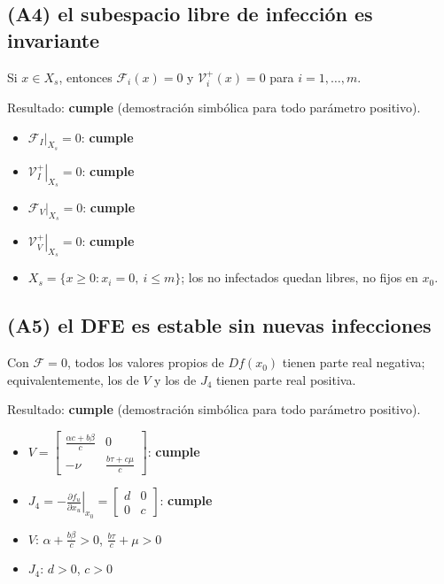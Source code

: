 \documentclass{article}
\begin{document}
\subsection*{(A4) el subespacio libre de infección es invariante}

Si $x \in X_s$, entonces $\mathcal{F}_i(x) = 0$ y $\mathcal{V}_i^+(x) = 0$ para $i = 1,\dots,m$.

Resultado: \textbf{cumple} (demostración simbólica para todo parámetro positivo).

\begin{itemize}
  \item $\left.\mathcal{F}_{I}\right\rvert_{X_s} = 0$: \textbf{cumple}
  \item $\left.\mathcal{V}_{I}^+\right\rvert_{X_s} = 0$: \textbf{cumple}
  \item $\left.\mathcal{F}_{V}\right\rvert_{X_s} = 0$: \textbf{cumple}
  \item $\left.\mathcal{V}_{V}^+\right\rvert_{X_s} = 0$: \textbf{cumple}
  \item $X_s = \{x \ge 0 : x_i = 0,\ i \le m\}$; los no infectados quedan libres, no fijos en $x_0$.
\end{itemize}

\subsection*{(A5) el DFE es estable sin nuevas infecciones}

Con $\mathcal{F} = 0$, todos los valores propios de $Df(x_0)$ tienen parte real negativa; equivalentemente, los de $V$ y los de $J_4$ tienen parte real positiva.

Resultado: \textbf{cumple} (demostración simbólica para todo parámetro positivo).

\begin{itemize}
  \item $V = \left[\begin{matrix}\frac{\alpha c + b \beta}{c} & 0\\- \nu & \frac{b \tau + c \mu}{c}\end{matrix}\right]$: \textbf{cumple}
  \item $J_4 = -\left.\frac{\partial f_u}{\partial x_u}\right\rvert_{x_0} = \left[\begin{matrix}d & 0\\0 & c\end{matrix}\right]$: \textbf{cumple}
  \item $V$: $\alpha + \frac{b \beta}{c} > 0$, $\frac{b \tau}{c} + \mu > 0$
  \item $J_4$: $d > 0$, $c > 0$
\end{itemize}
\end{document}
